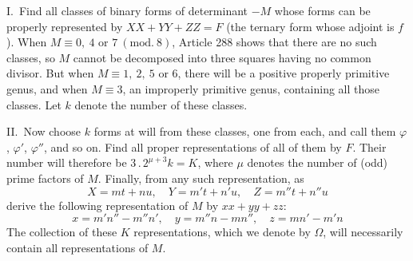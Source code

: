I.\ Find all classes of binary forms of determinant $-M$ whose
forms can be properly represented by $XX+YY+ZZ=F$ (the ternary form whose
adjoint is $f$). When $M\equiv0,\allowbreak \ 4\text{ or }7\ (\mathrm{mod.}\ 8)$, Article 288 shows that there are
no such classes, so $M$ cannot be decomposed into three squares
having no common divisor. But when $M\equiv1,\ 2,\ 5\text{ or }6$, there will
be a positive properly primitive genus, and when $M\equiv3$, an improperly
primitive genus, containing all those classes. Let $k$ denote
the number of these classes.

II.\ Now choose $k$ forms at will from these classes, one from
each, and call them $\varphi$, $\varphi'$, $\varphi''$, and so on. Find all
proper representations of all of them by $F$. Their number will
therefore be $3\, .\, 2^{\mu+3}k=K$, where $\mu$ denotes the number of (odd)
prime factors of $M$. Finally, from any such representation, as
\[
X=mt+nu,\quad Y=m't+n'u,\quad Z=m''t+n''u
\]
derive the following representation of $M$ by $xx+yy+zz$:
\[
x=m'n''-m''n',\quad y=m''n-mn'',\quad z=mn'-m'n
\]
The collection of these $K$ representations, which we denote by
$\Omega$, will necessarily contain all representations of $M$.

